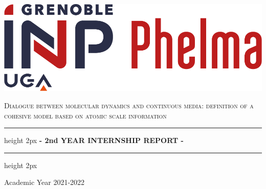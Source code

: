 \documentclass[11pt]{report}
\begin{document}
\begin{titlepage}
    \hfill
    \begin{center}
        \begin{minipage}{1\linewidth}
        \begin{minipage}{.5\linewidth}
              \begin{flushleft} %
             \includegraphics[scale=0.5]{logo phelma.png} %
            \end{flushleft}
        \end{minipage}
        \begin{minipage}{.5\linewidth}
              \begin{flushright}    
            \end{flushright}
        \end{minipage}
        \end{minipage}
        
        
        \textsc{\LARGE Dialogue between molecular dynamics and continuous media: definition of a cohesive model based on atomic scale information}

        \bigskip
        \bigskip
        \bigskip
        
        \hrule height 2px \bigskip
        { \huge \bfseries - 2nd YEAR INTERNSHIP REPORT - \\[0.4cm] }
        
        \hrule height 2px 

        \bigskip
        {\large Academic Year 2021-2022} \\[0.7cm] 
        

\end{center}
\end{titlepage}
\end{document}
